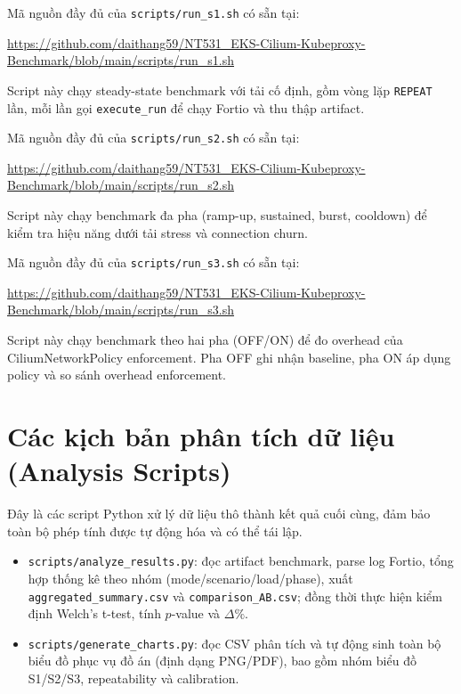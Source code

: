 Mã nguồn đầy đủ của \texttt{scripts/run\_s1.sh} có sẵn tại:

\begin{center}
\url{https://github.com/daithang59/NT531_EKS-Cilium-Kubeproxy-Benchmark/blob/main/scripts/run_s1.sh}
\end{center}

Script này chạy steady-state benchmark với tải cố định, gồm vòng lặp \texttt{REPEAT} lần, mỗi lần gọi \texttt{execute\_run} để chạy Fortio và thu thập artifact.

Mã nguồn đầy đủ của \texttt{scripts/run\_s2.sh} có sẵn tại:

\begin{center}
\url{https://github.com/daithang59/NT531_EKS-Cilium-Kubeproxy-Benchmark/blob/main/scripts/run_s2.sh}
\end{center}

Script này chạy benchmark đa pha (ramp-up, sustained, burst, cooldown) để kiểm tra hiệu năng dưới tải stress và connection churn.

Mã nguồn đầy đủ của \texttt{scripts/run\_s3.sh} có sẵn tại:

\begin{center}
\url{https://github.com/daithang59/NT531_EKS-Cilium-Kubeproxy-Benchmark/blob/main/scripts/run_s3.sh}
\end{center}

Script này chạy benchmark theo hai pha (OFF/ON) để đo overhead của CiliumNetworkPolicy enforcement. Pha OFF ghi nhận baseline, pha ON áp dụng policy và so sánh overhead enforcement.

\section{Các kịch bản phân tích dữ liệu (Analysis Scripts)}

Đây là các script Python xử lý dữ liệu thô thành kết quả cuối cùng, đảm bảo toàn bộ phép tính được tự động hóa và có thể tái lập.

\begin{itemize}
		\item \texttt{scripts/analyze\_results.py}: đọc artifact benchmark, parse log Fortio, tổng hợp thống kê theo nhóm (mode/scenario/load/phase), xuất \texttt{aggregated\_summary.csv} và \texttt{comparison\_AB.csv}; đồng thời thực hiện kiểm định Welch's t-test, tính \(p\)-value và \(\Delta\%\).
		\item \texttt{scripts/generate\_charts.py}: đọc CSV phân tích và tự động sinh toàn bộ biểu đồ phục vụ đồ án (định dạng PNG/PDF), bao gồm nhóm biểu đồ S1/S2/S3, repeatability và calibration.
\end{itemize}

